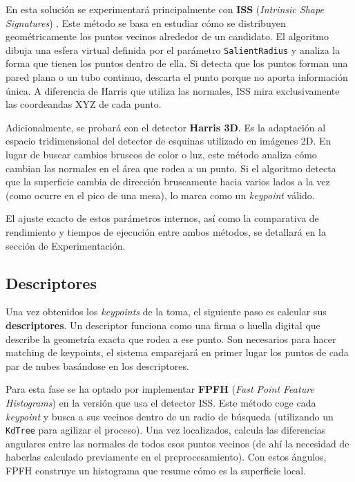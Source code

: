 \documentclass[11pt,letterpaper, onecolumn]{article}
\begin{document}
En esta solución se experimentará principalmente con \textbf{ISS} (\textit{Intrinsic Shape Signatures}) \parencite[]{zhong2009intrinsic}. Este método se basa en estudiar cómo se distribuyen geométricamente los puntos vecinos alrededor de un candidato. El algoritmo dibuja una esfera virtual definida por el parámetro \texttt{SalientRadius} y analiza la forma que tienen los puntos dentro de ella. Si detecta que los puntos forman una pared plana o un tubo continuo, descarta el punto porque no aporta información única. A diferencia de Harris que utiliza las normales, ISS mira exclusivamente las coordeandas XYZ de cada punto.

Adicionalmente, se probará con el detector \textbf{Harris 3D}. Es la adaptación al espacio tridimensional del detector de esquinas utilizado en imágenes 2D. En lugar de buscar cambios bruscos de color o luz, este método analiza cómo cambian las normales en el área que rodea a un punto. Si el algoritmo detecta que la superficie cambia de dirección bruscamente hacia varios lados a la vez (como ocurre en el pico de una mesa), lo marca como un \textit{keypoint} válido.
    
El ajuste exacto de estos parámetros internos, así como la comparativa de rendimiento y tiempos de ejecución entre ambos métodos, se detallará en la sección de Experimentación.



\subsection{Descriptores}
Una vez obtenidos los \textit{keypoints} de la toma, el siguiente paso es calcular sus \textbf{descriptores}. Un descriptor funciona como una firma o huella digital que describe la geometría exacta que rodea a ese punto. Son necesarios para hacer matching de keypoints, el sistema emparejará en primer lugar los puntos de cada par de nubes basándose en los descriptores.

Para esta fase se ha optado por implementar \textbf{FPFH} (\textit{Fast Point Feature Histograms}) \parencite[]{rusu2009fast} en la versión que usa el detector ISS. Este método coge cada \textit{keypoint} y busca a sus vecinos dentro de un radio de búsqueda (utilizando un \texttt{KdTree} para agilizar el proceso). Una vez localizados, calcula las diferencias angulares entre las normales de todos esos puntos vecinos (de ahí la necesidad de haberlas calculado previamente en el preprocesamiento). Con estos ángulos, FPFH construye un histograma que resume cómo es la superficie local.
\end{document}
